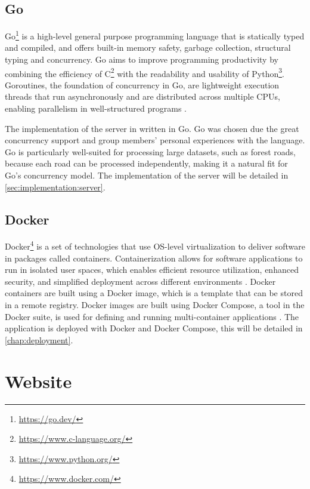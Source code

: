 \subsection{Go}\label{subsec:implementation:technologies:go}

Go\footnote{\url{https://go.dev/}} is a high-level general purpose programming language that is statically typed and compiled, and offers built-in memory safety, garbage collection, structural typing and concurrency. Go aims to improve programming productivity by combining the efficiency of C\footnote{\url{https://www.c-language.org/}} with the readability and usability of Python\footnote{\url{https://www.python.org/}}. Goroutines, the foundation of concurrency in Go, are lightweight execution threads that run asynchronously and are distributed across multiple CPUs, enabling parallelism in well-structured programs \cite{goproglanguage}.

The implementation of the server in written in Go. Go was chosen due the great concurrency support and group members' personal experiences with the language. Go is particularly well-suited for processing large datasets, such as forest roads, because each road can be processed independently, making it a natural fit for Go's concurrency model. The implementation of the server will be detailed in \autoref{sec:implementation:server}.

\subsection{Docker}\label{subsec:implementation:technologies:docker}

Docker\footnote{\url{https://www.docker.com/}} is a set of technologies that use OS-level virtualization to deliver software in packages called containers. Containerization allows for software applications to run in isolated user spaces, which enables efficient resource utilization, enhanced security, and simplified deployment across different environments \cite{containerizationwikipedia,dockerwikipedia}. Docker containers are built using a Docker image, which is a template that can be stored in a remote registry. Docker images are built using 
Docker Compose, a tool in the Docker suite, is used for defining and running multi-container applications \cite{dockercomposedocs}. The application is deployed with Docker and Docker Compose, this will be detailed in \autoref{chap:deployment}.

\section{Website}

